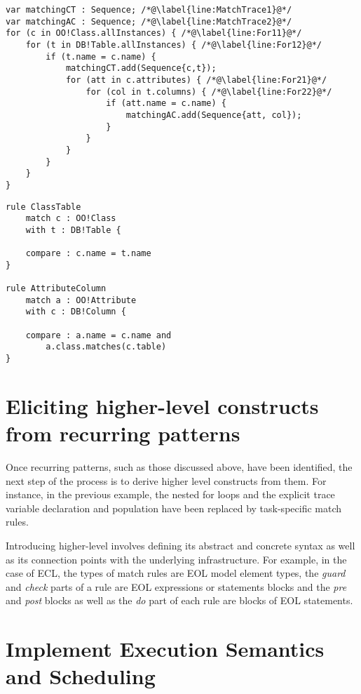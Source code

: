 \begin{lstlisting}[float=tbp, caption=Comparing an OO model with a DB model using EOL, label=lst:ComparisonEOL, language=EOL]
var matchingCT : Sequence; /*@\label{line:MatchTrace1}@*/
var matchingAC : Sequence; /*@\label{line:MatchTrace2}@*/
for (c in OO!Class.allInstances) { /*@\label{line:For11}@*/
	for (t in DB!Table.allInstances) { /*@\label{line:For12}@*/
		if (t.name = c.name) {
			matchingCT.add(Sequence{c,t});
			for (att in c.attributes) { /*@\label{line:For21}@*/
				for (col in t.columns) { /*@\label{line:For22}@*/
					if (att.name = c.name) {
						matchingAC.add(Sequence{att, col});
					}
				}
			}
		}
	}
}
\end{lstlisting}

\begin{lstlisting}[float=tbp, caption=Comparing an OO model with a DB model using ECL, label=lst:ComparisonECL, language=ECL]
rule ClassTable
	match c : OO!Class
	with t : DB!Table {
	
	compare : c.name = t.name
}

rule AttributeColumn
	match a : OO!Attribute 
	with c : DB!Column {
	
	compare : a.name = c.name and
		a.class.matches(c.table)
}
\end{lstlisting}

\section{Eliciting higher-level constructs from recurring patterns}

Once recurring patterns, such as those discussed above, have been identified, the next step of the process is to derive higher level constructs from them. For instance, in the previous example, the nested for loops and the explicit trace variable declaration and population have been replaced by task-specific match rules.

Introducing higher-level involves defining its abstract and concrete syntax as well as its connection points with the underlying infrastructure. For example, in the case of ECL, the types of match rules are EOL model element types, the \emph{guard} and \emph{check} parts of a rule are EOL expressions or statements blocks and the \emph{pre} and \emph{post} blocks as well as the \emph{do} part of each rule are blocks of EOL statements.

\section{Implement Execution Semantics and Scheduling}

